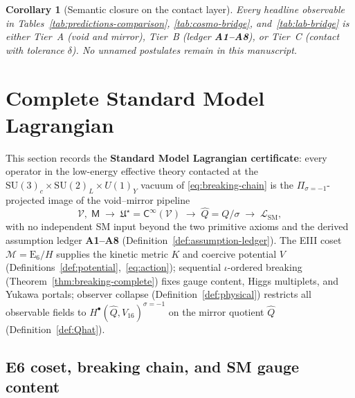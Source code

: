 \documentclass[aps,prd,onecolumn,amsmath,amssymb,nofootinbib,11pt]{revtex4-2}
\numberwithin{equation}{section}
\theoremstyle{plain}
\newtheorem{corollary}[theorem]{Corollary}
\theoremstyle{definition}
\theoremstyle{remark}
\newcommand{\E}[1]{\mathrm{E}_{#1}}
\newcommand{\Void}{\mathcal{V}}
\newcommand{\Mirror}{\mathsf{M}}
\newcommand{\Climb}{\mathsf{C}}
\begin{document}
\begin{corollary}[Semantic closure on the contact layer]\label{cor:semantic-closure}
Every headline observable in Tables~\ref{tab:predictions-comparison},
\ref{tab:cosmo-bridge}, and~\ref{tab:lab-bridge} is either Tier~A (void and
mirror), Tier~B (ledger \textbf{A1--A8}), or Tier~C (contact with tolerance
$\delta$). No unnamed postulates remain in this manuscript.
\end{corollary}%
\section{Complete Standard Model Lagrangian}
\label{sec:sm-lagrangian}

This section records the \textbf{Standard Model Lagrangian certificate}:
every operator in the low-energy effective theory contacted at the
$\mathrm{SU}(3)_c\times\mathrm{SU}(2)_L\times U(1)_Y$ vacuum of
\eqref{eq:breaking-chain} is the $\Pi_{\sigma=-1}$-projected image of the
void--mirror pipeline
\begin{equation}\label{eq:sm-pipeline}
  \Void,\;\Mirror
  \;\longrightarrow\;
  \mathfrak{U}^\star=\Climb^\infty(\Void)
  \;\longrightarrow\;
  \hat Q=Q/\sigma
  \;\longrightarrow\;
  \mathcal{L}_{\mathrm{SM}},
\end{equation}
with no independent SM input beyond the two primitive axioms and the derived
assumption ledger \textbf{A1--A8}
(Definition~\ref{def:assumption-ledger}). The EIII coset
$\mathcal{M}=\E{6}/H$ supplies the kinetic metric $K$ and coercive potential
$V$ (Definitions~\ref{def:potential},~\eqref{eq:action}); sequential
$\iota$-ordered breaking (Theorem~\ref{thm:breaking-complete}) fixes gauge
content, Higgs multiplets, and Yukawa portals; observer collapse
(Definition~\ref{def:physical}) restricts all observable fields to
$H^\bullet(\hat Q,V_{16})^{\sigma=-1}$ on the mirror quotient
$\hat Q$ (Definition~\ref{def:Qhat}).

\subsection{E6 coset, breaking chain, and SM gauge content}
\label{sec:sm-lagrangian:breaking}
\end{document}
